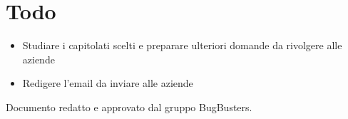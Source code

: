 \documentclass[a4paper,12pt]{article}
\begin{document}
\section{Todo}

\begin{tcolorbox}[colback=secondaryblue!8,colframe=secondaryblue!60,arc=2mm,boxrule=0.5pt,left=10pt,right=10pt]
\begin{itemize}[topsep=5pt]
    \item Studiare i capitolati scelti e preparare ulteriori domande da rivolgere alle aziende
    \item Redigere l'email da inviare alle aziende
\end{itemize}
\end{tcolorbox}

\vfill
\begin{center}
    {\small\color{darkgray} Documento redatto e approvato dal gruppo BugBusters.}
\end{center}
\end{document}
